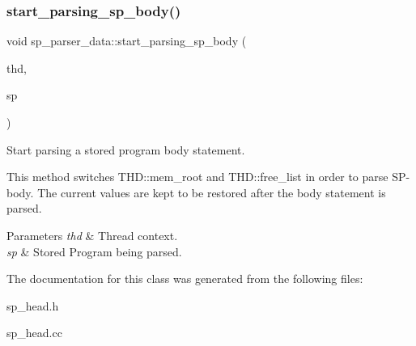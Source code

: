\subsubsection{\texorpdfstring{start\+\_\+parsing\+\_\+sp\+\_\+body()}{start\_parsing\_sp\_body()}}
{\footnotesize\ttfamily void sp\+\_\+parser\+\_\+data\+::start\+\_\+parsing\+\_\+sp\+\_\+body (\begin{DoxyParamCaption}\item[{T\+HD $\ast$}]{thd,  }\item[{\mbox{\hyperlink{classsp__head}{sp\+\_\+head}} $\ast$}]{sp }\end{DoxyParamCaption})}

Start parsing a stored program body statement.

This method switches T\+H\+D\+::mem\+\_\+root and T\+H\+D\+::free\+\_\+list in order to parse SP-\/body. The current values are kept to be restored after the body statement is parsed.


\begin{DoxyParams}{Parameters}
{\em thd} & Thread context. \\
\hline
{\em sp} & Stored Program being parsed. \\
\hline
\end{DoxyParams}


The documentation for this class was generated from the following files\+:\begin{DoxyCompactItemize}
\item 
sp\+\_\+head.\+h\item 
sp\+\_\+head.\+cc\end{DoxyCompactItemize}

